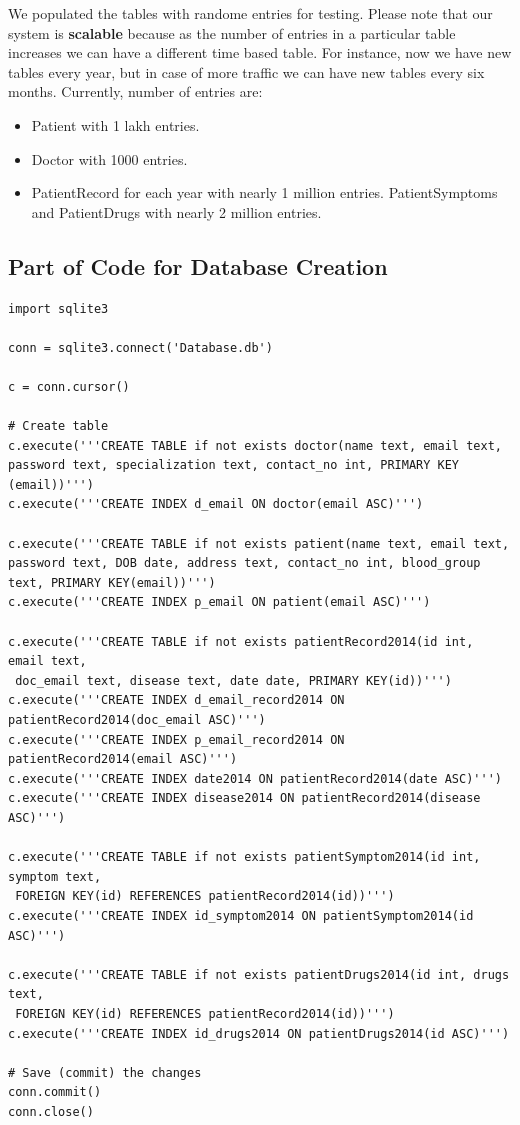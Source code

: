 \documentclass{article}
\begin{document}
We populated the tables with randome entries for testing. Please note that our system is {\bf scalable} because as the number of entries in a particular table increases we can have a different time based table. For instance, now we have new tables every year, but in case of more traffic we can have new tables every six months. Currently, number of entries are:
\begin{itemize}
\item Patient with 1 lakh entries.
\item Doctor with 1000 entries.
\item PatientRecord for each year with nearly 1 million entries. PatientSymptoms and PatientDrugs with nearly 2 million entries.
\end{itemize}

\subsection{Part of Code for Database Creation}

\begin{lstlisting}
import sqlite3

conn = sqlite3.connect('Database.db')

c = conn.cursor()

# Create table
c.execute('''CREATE TABLE if not exists doctor(name text, email text, 
password text, specialization text, contact_no int, PRIMARY KEY (email))''')
c.execute('''CREATE INDEX d_email ON doctor(email ASC)''')

c.execute('''CREATE TABLE if not exists patient(name text, email text, 
password text, DOB date, address text, contact_no int, blood_group text, PRIMARY KEY(email))''')
c.execute('''CREATE INDEX p_email ON patient(email ASC)''')

c.execute('''CREATE TABLE if not exists patientRecord2014(id int, email text,
 doc_email text, disease text, date date, PRIMARY KEY(id))''')
c.execute('''CREATE INDEX d_email_record2014 ON patientRecord2014(doc_email ASC)''')
c.execute('''CREATE INDEX p_email_record2014 ON patientRecord2014(email ASC)''')
c.execute('''CREATE INDEX date2014 ON patientRecord2014(date ASC)''')
c.execute('''CREATE INDEX disease2014 ON patientRecord2014(disease ASC)''')

c.execute('''CREATE TABLE if not exists patientSymptom2014(id int, symptom text,
 FOREIGN KEY(id) REFERENCES patientRecord2014(id))''')
c.execute('''CREATE INDEX id_symptom2014 ON patientSymptom2014(id ASC)''')

c.execute('''CREATE TABLE if not exists patientDrugs2014(id int, drugs text,
 FOREIGN KEY(id) REFERENCES patientRecord2014(id))''')
c.execute('''CREATE INDEX id_drugs2014 ON patientDrugs2014(id ASC)''')

# Save (commit) the changes
conn.commit()
conn.close()
\end{lstlisting}
\vspace{0.4in}
\end{document}
